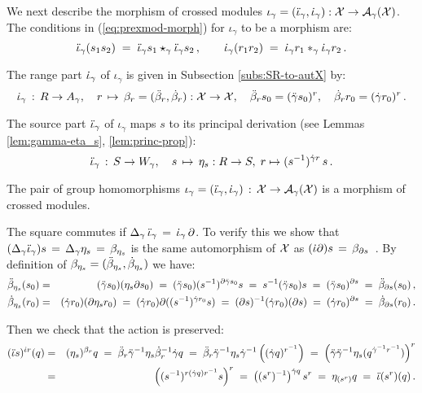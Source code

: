 We next describe the morphism of crossed modules
$\iota_{\gamma} = (\ddot{\iota}_{\gamma},\dot{\iota}_{\gamma}) 
 : \mathcal{X} \to \mathcal{A}_{\gamma}(\mathcal{X})$. 
The conditions in (\ref{eq:prexmod-morph}) 
for $\iota_{\gamma}$ to be a morphism are: 
\begin{equation} \label{eq:6}
\ddot{\iota}_{\gamma}(s_1s_2) 
\;=\; \ddot{\iota}_{\gamma} s_1 \star_{\gamma} \ddot{\iota}_{\gamma} s_2\,,
\quad\quad 
\dot{\iota}_{\gamma}(r_1r_2) \;=\; \dot{\iota}_{\gamma} r_1 \ast_{\gamma} \dot{\iota}_{\gamma} r_2\,.
\end{equation}

\noindent
The range part  $\dot{\iota}_{\gamma}$  of  $\iota_{\gamma}$  
is given in Subsection \ref{subs:SR-to-autX} by: 
$$
\dot{\iota}_{\gamma} \,:\, R \to A_{\gamma}, \quad
r \,\mapsto\, \beta_r = (\ddot{\beta}_r,\dot{\beta}_r) : \mathcal{X} \to \mathcal{X},
\quad \ddot{\beta}_r s_0 = (\ddot{\gamma} s_0)^r,
\quad  \dot{\beta}_r r_0 = (\dot{\gamma} r_0)^r\,.
$$

\noindent
The source part  $\ddot{\iota}_{\gamma}$  of $\iota_{\gamma}$  
maps $s$ to its principal derivation 
(see Lemmas \ref{lem:gamma-eta_s}, \ref{lem:princ-prop}): 
$$
\ddot{\iota}_{\gamma} \,:\, S \to W_{\gamma}, \quad 
s \,\mapsto\, \eta_s : R \to S,\; r \mapsto (s^{-1})^{\dot{\gamma} r}\,s\,.
$$

\begin{thm} \label{thm:iota}
The pair of group homomorphisms  
$\iota_{\gamma} = (\ddot{\iota}_{\gamma},\dot{\iota}_{\gamma}) 
 \,:\,  \mathcal{X} \to \mathcal{A}_{\gamma}(\mathcal{X})$
is a morphism of crossed modules.
\end{thm}
\begin{pf}
The square commutes if 
$\Delta_{\gamma}\,\ddot{\iota}_{\gamma} \,=\, \dot{\iota}_{\gamma}\,\partial$. 
To verify this we show that
$(\Delta_{\gamma}\ddot{\iota}_{\gamma})s \,=\, \Delta_{\gamma}\eta_s 
                                 \,=\, \beta_{\eta_s}$
is the same automorphism of  $\mathcal{X}$  as
$(\dot{\iota}\partial)s \,=\, \beta_{\partial s}$~. 
By definition of  $\beta_{\eta_s} = (\ddot{\beta}_{\eta_s},\dot{\beta}_{\eta_s})$  we have: 
\begin{eqnarray*}
\ddot{\beta}_{\eta_s}(s_0) 
  & = & (\ddot{\gamma} s_0)(\eta_s\partial s_0) 
  \;=\; (\ddot{\gamma} s_0)(s^{-1})^{\partial \ddot{\gamma} s_0}s
  \;=\; s^{-1}(\ddot{\gamma} s_0)s 
  \;=\; (\ddot{\gamma} s_0)^{\partial s} 
  \;=\; \ddot{\beta}_{\partial s}(s_0) \,, \\
\dot{\beta}_{\eta_s}(r_0) 
  & = & (\dot{\gamma} r_0)(\partial\eta_s r_0) 
  \;=\; (\dot{\gamma} r_0) \partial((s^{-1})^{\dot{\gamma} r_0}s)
  \;=\; (\partial s)^{-1}(\dot{\gamma} r_0)(\partial s) 
  \;=\; (\dot{\gamma} r_0)^{\partial s} 
  \;=\; \dot{\beta}_{\partial s}(r_0) \,. 
\end{eqnarray*}

\noindent
Then we check that the action is preserved:
\begin{eqnarray*} 
(\ddot{\iota} s)^{\dot{\iota} r}(q) 
  & = &  (\eta_s)^{\beta_r}q 
  \;=\;  \ddot{\beta}_r \ddot{\gamma}^{-1} \eta_s \dot{\beta}_r^{-1} \dot{\gamma} q 
  \;=\;  \ddot{\beta}_r \ddot{\gamma}^{-1} \eta_s \dot{\gamma}^{-1} \left( (\dot{\gamma} q)^{r^{-1}} \right) 
  \;=\;  \left( \ddot{\gamma} \ddot{\gamma}^{-1} \eta_s ( q^{\dot{\gamma}^{-1}r^{-1}} ) \right)^r \\ 
  & = &  \left( (s^{-1})^{r(\dot{\gamma} q)r^{-1}} s \right)^r 
  \;=\;  \left( (s^r)^{-1} \right)^{\dot{\gamma} q} s^r 
  \;=\;  \eta_{(s^r)}q 
  \;=\;  \ddot{\iota}(s^r)(q) \,.
\end{eqnarray*} 
\end{pf}

